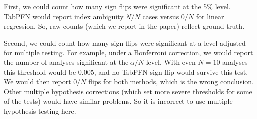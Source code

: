 First, we could count how many sign flips were significant at the 5\% level. 
TabPFN would report index ambiguity $N/N$ cases versus $0/N$ for linear regression.
So, raw counts (which we report in the paper) reflect ground truth.

Second, we could count how many sign flips were significant at a level adjusted for multiple testing.
For example, under a Bonferroni correction, we would report the number of analyses significant at the $\alpha / N$ level.
With even $N = 10$ analyses this threshold would be $0.005$, and no TabPFN sign flip would survive this test.
We would then report $0/N$ flips for both methods, which is the wrong conclusion.
Other multiple hypothesis corrections (which set more severe thresholds for some of the tests) would have similar problems.
So it is incorrect to use multiple hypothesis testing here.